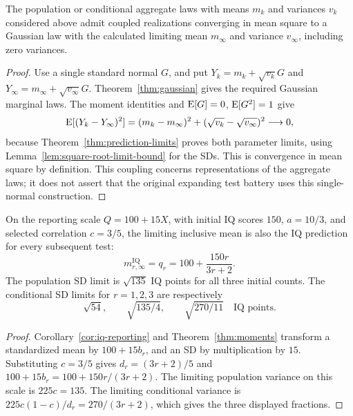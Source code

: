 \begin{proposition}
\label{prop:gaussian-limit-coupling}
The population or conditional aggregate laws with means \(m_k\) and
variances \(v_k\) considered above admit coupled realizations converging
in mean square to a Gaussian law with the calculated limiting mean
\(m_\infty\) and variance \(v_\infty\), including zero variances.
\end{proposition}
\begin{proof}
Use a single standard normal \(G\), and put
\(Y_k=m_k+\sqrt{v_k}G\) and
\(Y_\infty=m_\infty+\sqrt{v_\infty}G\).
Theorem~\ref{thm:gaussian} gives the required Gaussian marginal laws.
The moment identities and \(\operatorname{E}[G]=0\), \(\operatorname{E}[G^2]=1\) give
\[
 \operatorname{E}[(Y_k-Y_\infty)^2]
 =(m_k-m_\infty)^2+
   (\sqrt{v_k}-\sqrt{v_\infty})^2\longrightarrow0,
\]
because Theorem~\ref{thm:prediction-limits} proves both parameter
limits, using Lemma~\ref{lem:square-root-limit-bound} for the SDs.
This is convergence in mean square by definition. This coupling concerns
representations of the aggregate laws; it does not assert that the
original expanding test battery uses this single-normal construction.
\end{proof}

\begin{corollary}
\label{cor:iq150-limits}
On the reporting scale \(Q=100+15X\), with initial IQ scores \(150\),
\(a=10/3\), and selected correlation \(c=3/5\), the limiting inclusive
mean is also the IQ prediction for every subsequent test:
\begin{equation}
 m_{r,\infty}^{\mathrm{IQ}}=q_r
 =100+\frac{150r}{3r+2}.
 \label{eq:iq150-limit-means}
\end{equation}
The population SD limit is \(\sqrt{135}\) IQ points for all three initial
counts. The conditional SD limits for \(r=1,2,3\) are respectively
\begin{equation}
 \sqrt{54},\qquad \sqrt{135/4},\qquad \sqrt{270/11}
 \quad\text{IQ points}.
 \label{eq:iq150-limit-sds}
\end{equation}
\end{corollary}
\begin{proof}
Corollary~\ref{cor:iq-reporting} and Theorem~\ref{thm:moments} transform a
standardized mean by \(100+15b_r\), and an SD by multiplication by
\(15\). Substituting \(c=3/5\) gives
\(d_r=(3r+2)/5\) and \(100+15b_r=100+150r/(3r+2)\).
The limiting population variance on this scale is \(225c=135\).
The limiting conditional variance is
\(225c(1-c)/d_r=270/(3r+2)\), which gives the three displayed fractions.
\end{proof}

